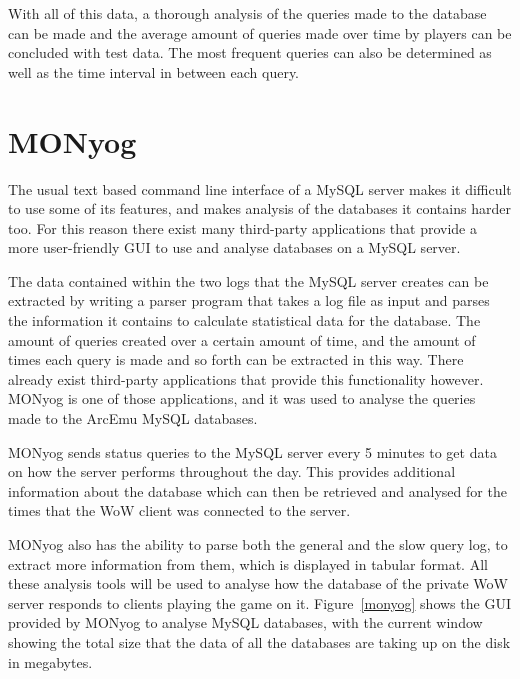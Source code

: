 With all of this data, a thorough analysis of the queries made to the database can be made and the average amount of queries made over time by players can be concluded with test data. The most frequent queries can also be determined as well as the time interval in between each query.



\section{MONyog} %

The usual text based command line interface of a MySQL server makes it difficult to use some of its features, and makes analysis of the databases it contains harder too. For this reason there exist many third-party applications that provide a more user-friendly GUI to use and analyse databases on a MySQL server. 

The data contained within the two logs that the MySQL server creates can be extracted by writing a parser program that takes a log file as input and parses the information it contains to calculate statistical data for the database. The amount of queries created over a certain amount of time, and the amount of times each query is made and so forth can be extracted in this way. There already exist third-party applications that provide this functionality however. MONyog is one of those applications,  and it was used to analyse the queries made to the ArcEmu MySQL databases.

MONyog sends status queries to the MySQL server every 5 minutes to get data on how the server performs throughout the day. This provides additional information about the database which can then be retrieved and analysed for the times that the WoW client was connected to the server.

MONyog also has the ability to parse both the general and the slow query log, to extract more information from them, which is displayed  in tabular format. All these analysis tools will be used to analyse how the database of the private WoW server responds to clients playing the game on it. Figure~\ref{monyog} shows the GUI provided by MONyog to analyse MySQL databases, with the current window showing the total size that the data of all the databases are taking up on the disk in megabytes. 


